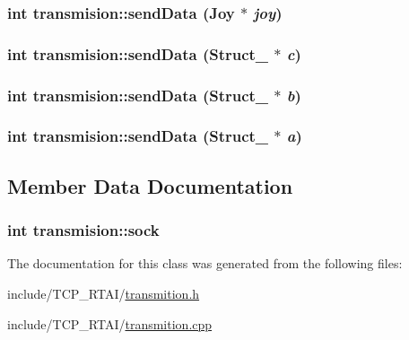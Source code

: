 \hypertarget{classtransmision_a07a6ca5245553367f31662bb9ae9ce5c}{
\subsubsection[{sendData}]{\setlength{\rightskip}{0pt plus 5cm}int transmision::sendData ({\bf Joy} $\ast$ {\em joy})}}
\label{classtransmision_a07a6ca5245553367f31662bb9ae9ce5c}
\hypertarget{classtransmision_a1d6f5d22ea3139d9580bd489e78c15b5}{
\subsubsection[{sendData}]{\setlength{\rightskip}{0pt plus 5cm}int transmision::sendData ({\bf Struct\_} $\ast$ {\em c})}}
\label{classtransmision_a1d6f5d22ea3139d9580bd489e78c15b5}
\hypertarget{classtransmision_a30a3f43077162e430096e9415749d31c}{
\subsubsection[{sendData}]{\setlength{\rightskip}{0pt plus 5cm}int transmision::sendData ({\bf Struct\_} $\ast$ {\em b})}}
\label{classtransmision_a30a3f43077162e430096e9415749d31c}
\hypertarget{classtransmision_aafa9957efe4d2fc1472a5b298650122d}{
\subsubsection[{sendData}]{\setlength{\rightskip}{0pt plus 5cm}int transmision::sendData ({\bf Struct\_} $\ast$ {\em a})}}
\label{classtransmision_aafa9957efe4d2fc1472a5b298650122d}


\subsection{Member Data Documentation}
\hypertarget{classtransmision_a3852938bfe54a2b913a7965824fb2acf}{
\subsubsection[{sock}]{\setlength{\rightskip}{0pt plus 5cm}int {\bf transmision::sock}}}
\label{classtransmision_a3852938bfe54a2b913a7965824fb2acf}


The documentation for this class was generated from the following files:\begin{DoxyCompactItemize}
\item 
include/TCP\_\-RTAI/\hyperlink{transmition_8h}{transmition.h}\item 
include/TCP\_\-RTAI/\hyperlink{transmition_8cpp}{transmition.cpp}\end{DoxyCompactItemize}
